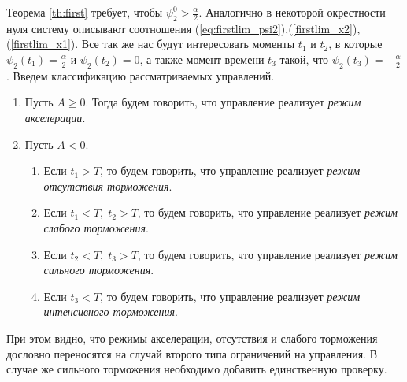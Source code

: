 Теорема \ref{th:first} требует, чтобы
$\psi_2^0 > \frac{\alpha}{2}$. Аналогично в некоторой окрестности нуля систему описывают соотношения (\ref{eq:firstlim_psi2}),(\ref{firstlim_x2}),(\ref{firstlim_x1}). Все так же нас будут интересовать моменты $t_1$ и $t_2$, в которые
$\psi_2(t_1) = \frac{\alpha}{2}$
и
$\psi_2(t_2) = 0$,
а также момент времени $t_3$ такой, что
$\psi_2(t_3) = -\frac{\alpha}{2}$.
Введем классификацию рассматриваемых управлений.
\begin{enumerate}
        \item Пусть $A \geqslant 0$. Тогда будем говорить, что управление реализует \textit{режим акселерации}.
        \item Пусть $A < 0$.
        \begin{enumerate}
                \item Если $t_1 > T$, то будем говорить, что управление реализует \textit{режим отсутствия торможения}.
                \item Если $t_1 < T, \; t_2 > T$, то будем говорить, что управление реализует \textit{режим слабого торможения}.
                \item Если $t_2 < T,\; t_3 > T$, то будем говорить, что управление реализует \textit{режим сильного торможения}.
                \item Если $t_3 < T$, то будем говорить, что управление реализует \textit{режим интенсивного торможения}.
        \end{enumerate}
\end{enumerate}

При этом видно, что режимы акселерации, отсутствия и слабого торможения дословно переносятся на случай второго типа ограничений на управления. В случае же сильного торможения необходимо добавить единственную проверку.


